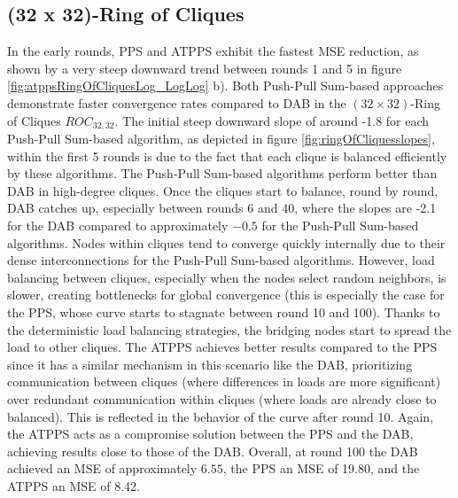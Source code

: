 \subsection{(32 x 32)-Ring of Cliques}\label{subsec:32_32ROC}
In the early rounds, PPS and ATPPS exhibit the fastest MSE reduction, as shown by a very steep downward trend between rounds 1 and 5 in figure \ref{fig:atppsRingOfCliquesLog_LogLog} b). Both Push-Pull Sum-based approaches demonstrate faster convergence rates compared to DAB in the $(32\times 32)$-Ring of Cliques $ROC_{32,32}$. The initial steep downward slope of around -1.8 for each Push-Pull Sum-based algorithm, as depicted in figure \ref{fig:ringOfCliquesslopes}, within the first 5 rounds is due to the fact that each clique is balanced efficiently by these algorithms. The Push-Pull Sum-based algorithms perform better than DAB in high-degree cliques. Once the cliques start to balance, round by round, DAB catches up, especially between rounds 6 and 40, where the slopes are -2.1 for the DAB compared to approximately $-0.5$ for the Push-Pull Sum-based algorithms. Nodes within cliques tend to converge quickly internally due to their dense interconnections for the Push-Pull Sum-based algorithms. However, load balancing between cliques, especially when the nodes select random neighbors, is slower, creating bottlenecks for global convergence (this is especially the case for the PPS, whose curve starts to stagnate between round 10 and 100). Thanks to the deterministic load balancing strategies, the bridging nodes start to spread the load to other cliques. The ATPPS achieves better results compared to the PPS since it has a similar mechanism in this scenario like the DAB, prioritizing communication between cliques (where differences in loads are more significant) over redundant communication within cliques (where loads are already close to balanced). This is reflected in the behavior of the curve after round 10. Again, the ATPPS acts as a compromise solution between the PPS and the DAB, achieving results close to those of the DAB. Overall, at round 100 the DAB achieved an MSE of approximately $6.55$, the PPS an MSE of 19.80, and the ATPPS an MSE of 8.42.

